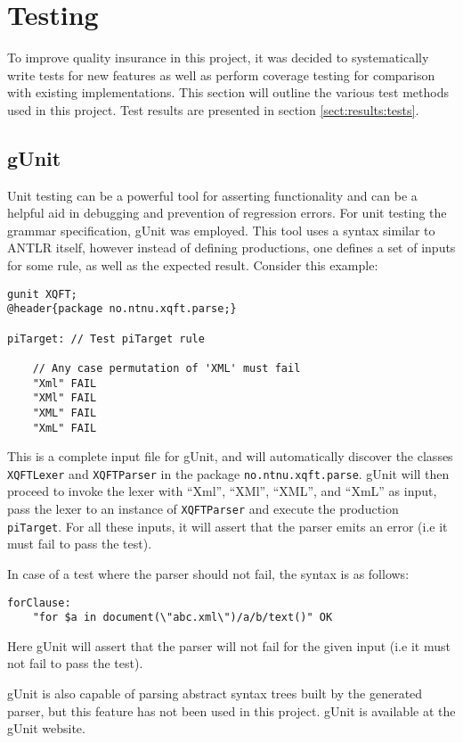 \section{Testing}
\label{sect:method:testing}
To improve quality insurance in this project, it was decided to systematically
write tests for new features as well as perform coverage testing for comparison
with existing implementations. This section will outline the various test
methods used in this project. Test results are presented in section \ref{sect:results:tests}.

\subsection{gUnit}
\label{sect:method:gUnit}
Unit testing can be a powerful tool for asserting functionality and can be a
helpful aid in debugging and prevention of regression errors.  For unit testing the
grammar specification, gUnit \cite{gunit00} was employed. This tool uses a
syntax similar to ANTLR itself, however instead of defining productions, one
defines a set of inputs for some rule, as well as the expected result. Consider
this example:

\begin{Verbatim}
gunit XQFT;
@header{package no.ntnu.xqft.parse;}

piTarget: // Test piTarget rule

    // Any case permutation of 'XML' must fail
    "Xml" FAIL
    "XMl" FAIL
    "XML" FAIL
    "XmL" FAIL
\end{Verbatim}

This is a complete input file for gUnit, and will automatically discover the
classes \verb!XQFTLexer! and \verb!XQFTParser! in the package
\verb!no.ntnu.xqft.parse!. gUnit will  then proceed to invoke the lexer with
``Xml'', ``XMl'', ``XML'', and ``XmL'' as input, pass the lexer to an instance
of \verb!XQFTParser! and execute the production \verb!piTarget!. For all these
inputs, it will assert that the parser emits an error (i.e it must fail to pass
the test).

In case of a test where the parser should not fail, the syntax is as follows:
\begin{Verbatim}
forClause:
	"for $a in document(\"abc.xml\")/a/b/text()" OK
\end{Verbatim}
Here gUnit will assert that the parser will not fail for the given input (i.e it
must not fail to pass the test).

gUnit is also capable of parsing abstract syntax trees built by the generated
parser, but this feature has not been used in this project. gUnit is available
at the gUnit website\cite{gunit00}.

